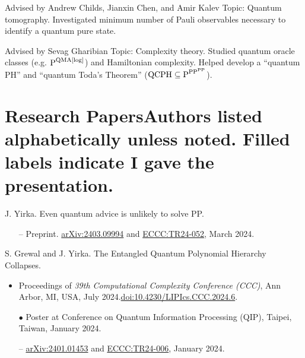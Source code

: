 \documentclass[11pt,letterpaper,serif]{moderncv}
\begin{document}
{}{}{}
{
	\begin{adjustwidth}{.25in}{}
		Advised by Andrew Childs, Jianxin Chen, and Amir Kalev \newline
		Topic: Quantum tomography. Investigated minimum number of Pauli observables necessary to identify a quantum pure state.
	\end{adjustwidth}
}

{
	\begin{adjustwidth}{.25in}{}
		Advised by Sevag Gharibian \newline
		Topic: Complexity theory. Studied quantum oracle classes  (e.g. {\scriptsize $\textup{P}^{\textup{QMA[log]}}$}) and Hamiltonian complexity. Helped develop a ``quantum PH'' and ``quantum Toda's Theorem'' ({\scriptsize $\textup{QCPH}\subseteq \textup{P}^{\textup{PP}^{\textup{PP}}}$}).
	\end{adjustwidth}
}


\section{Research Papers\hfill{\footnotesize \normalfont Authors listed alphabetically unless noted. Filled labels indicate I gave the presentation.}}

J. Yirka.\quad
Even quantum advice is unlikely to solve \textup{PP}.
\begin{adjustwidth}{.1in}{}
	\begin{itemize}
		\item[--] Preprint. \href{https://arxiv.org/abs/2403.09994}{arXiv:2403.09994} and \href{https://eccc.weizmann.ac.il/report/2024/052/}{ECCC:TR24-052}, March 2024.
	\end{itemize}
\end{adjustwidth}
\medskip

S. Grewal and J. Yirka.\quad
The Entangled Quantum Polynomial Hierarchy Collapses.
\begin{adjustwidth}{.1in}{}
	\begin{itemize}
		\item Proceedings of \textit{39th Computational Complexity Conference (CCC)}, Ann Arbor, MI, USA, July 2024.\quad \href{https://doi.org/10.4230/LIPIcs.CCC.2024.6}{doi:10.4230/LIPIcs.CCC.2024.6}.
		\item[$\bullet$] Poster at Conference on Quantum Information Processing (QIP), Taipei, Taiwan, January 2024.
		\item[--] \href{https://arxiv.org/abs/2401.01453}{arXiv:2401.01453} and \href{https://eccc.weizmann.ac.il/report/2024/006/}{ECCC:TR24-006}, January 2024.
	\end{itemize}
\end{adjustwidth}
\medskip
\end{document}
